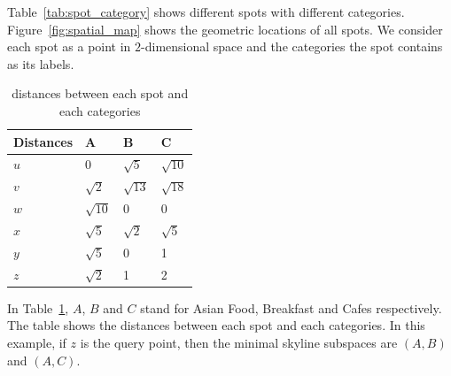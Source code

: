 Table~\ref{tab:spot_category} shows different spots with different categories. Figure~\ref{fig:spatial_map} shows the geometric locations of all spots. We consider each spot as a point in $2$-dimensional space and the categories the spot contains as its labels.

\begin{table}[h]
    \centering
    \begin{tabular}{llll}
    \hline
    Distances & A & B & C \\ \hline
    $u$       & 0 & $\sqrt{5}$ & $\sqrt{10}$ \\ \hline
    $v$       & $\sqrt{2}$ & $\sqrt{13}$ & $\sqrt{18}$ \\ \hline
    $w$       & $\sqrt{10}$ & 0 & 0 \\ \hline
    $x$       & $\sqrt{5}$ & $\sqrt{2}$ & $\sqrt{5}$ \\ \hline
    $y$       & $\sqrt{5}$ & 0 & 1 \\ \hline
    $z$       & $\sqrt{2}$ & 1 & 2 \\ \hline
    \end{tabular}
    \caption{\label{font-table} distances between each spot and each categories}
    \label{tab:distances_spatial}
\end{table}

In Table~\ref{tab:distances_spatial}, $A$, $B$ and $C$ stand for Asian Food, Breakfast and Cafes respectively. The table shows the distances between each spot and each categories. In this example, if $z$ is the query point, then the minimal skyline subspaces are $(A, B)$ and $(A, C)$.


